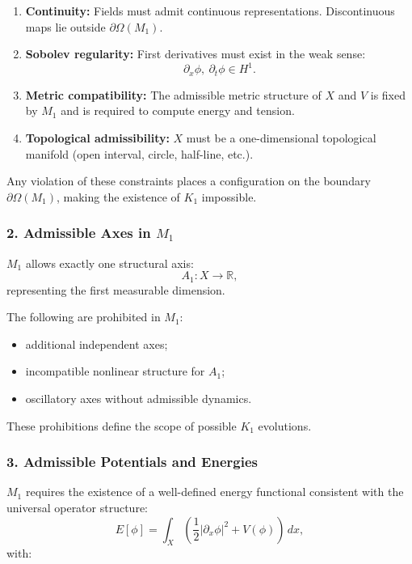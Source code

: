 \begin{enumerate}
    \item \textbf{Continuity:}  
    Fields must admit continuous representations. Discontinuous maps lie outside $\partial\Omega(M_1)$.

    \item \textbf{Sobolev regularity:}  
    First derivatives must exist in the weak sense:
    \[
    \partial_x \phi,\ \partial_t \phi \in H^1.
    \]

    \item \textbf{Metric compatibility:}  
    The admissible metric structure of $X$ and $V$ is fixed by $M_1$ and is required to compute energy and tension.

    \item \textbf{Topological admissibility:}  
    $X$ must be a one-dimensional topological manifold
    (open interval, circle, half-line, etc.).
\end{enumerate}

Any violation of these constraints places a configuration on the boundary
$\partial\Omega(M_1)$, making the existence of $K_1$ impossible.

\subsubsection*{2. Admissible Axes in \texorpdfstring{$M_1$}{M_1}}

$M_1$ allows exactly one structural axis:
\[
A_1 : X \to \mathbb{R},
\]
representing the first measurable dimension.

The following are prohibited in $M_1$:

\begin{itemize}
    \item additional independent axes;
    \item incompatible nonlinear structure for $A_1$;
    \item oscillatory axes without admissible dynamics.
\end{itemize}

These prohibitions define the scope of possible $K_1$ evolutions.

\subsubsection*{3. Admissible Potentials and Energies}

$M_1$ requires the existence of a well-defined energy functional
consistent with the universal operator structure:
\[
E[\phi] = \int_X \left(
\frac{1}{2} |\partial_x \phi|^2 + V(\phi)
\right)\,dx,
\]
with:

